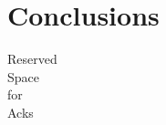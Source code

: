 \section{Conclusions}
\label{sec:conclusions}





\begin{acks}

  Reserved\\
  Space\\
  for\\
  Acks

\end{acks}
